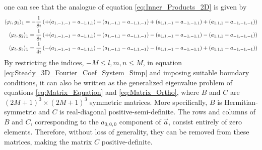 \documentclass[11pt]{amsart}
\begin{document}
one can see that the analogue of equation \eqref{eq:Inner_Products_2D}
is given by 
%
\begin{align}\label{eq:Inner_Products_3D}
  \langle\varphi_l,g_1\rangle_1=-\frac{1}{8\imath}&\left( +(a_{1,-1,-1}-a_{-1,1,1})
                              +(a_{1,-1,1}-a_{-1,1,-1})
                              +(a_{1,1,-1}-a_{-1,-1,1})
                              +(a_{1,1,1}-a_{-1,-1,-1})
  \right)               
              \notag\\
  \langle\varphi_l,g_2\rangle_1=\frac{1}{8\imath}&\left( +(a_{1,-1,-1}-a_{-1,1,1})
                             +(a_{1,-1,1}-a_{-1,1,-1})
                             -(a_{1,1,-1}-a_{-1,-1,1})
                             -(a_{1,1,1}-a_{-1,-1,-1})
  \right)               
               \notag\\
  \langle\varphi_l,g_3\rangle_1=\frac{1}{4\imath}&\left( -(a_{1,-1,-1}-a_{-1,1,1})
                             +(a_{1,-1,1}-a_{-1,1,-1})
                             -(a_{1,1,-1}-a_{-1,-1,1})
                             +(a_{1,1,1}-a_{-1,-1,-1})
  \right)               
\end{align}
%
By restricting the indices, $-M\leq l,m,n\leq M$, in equation
\eqref{eq:Steady_3D_Fourier_Coef_System_Simp} and imposing suitable
boundary conditions, it can also be written as the generalized
eigenvalue problem of equations \eqref{eq:Matrix_Equation} and
\eqref{eq:Matrix_Ortho}, where  $B$ and $C$ are $(2M+1)^3\times(2M+1)^3$
symmetric matrices. More specifically, $B$ is Hermitian-symmetric and
$C$ is real-diagonal positive-semi-definite. The rows and
columns of $B$ and $C$, corresponding to the $a_{0,0,0}$ component of
$\vec{a}$, consist entirely of zero elements. Therefore, without loss
of generality, they can be removed from these matrices, making the
matrix $C$ positive-definite.
%
\end{document}
